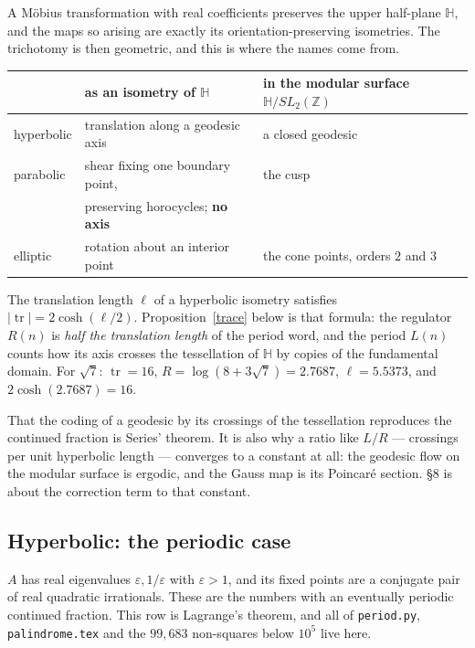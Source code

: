 \documentclass[12pt,a4paper]{article}
\theoremstyle{plain}
\theoremstyle{definition}
\newcommand{\tr}{\operatorname{tr}}
\begin{document}
A M\"obius transformation with real coefficients preserves the upper half-plane $\mathbb{H}$, and the maps so arising are exactly its orientation-preserving isometries. The trichotomy is then geometric, and this is where the names come from.

\begin{center}
\begin{tabular}{lll}
\toprule
 & as an isometry of $\mathbb{H}$ & in the modular surface $\mathbb{H}/SL_2(\mathbb{Z})$ \\
\midrule
hyperbolic & translation along a geodesic axis & a closed geodesic \\
parabolic  & shear fixing one boundary point, & the cusp \\
           & preserving horocycles; \textbf{no axis} & \\
elliptic   & rotation about an interior point & the cone points, orders $2$ and $3$ \\
\bottomrule
\end{tabular}
\end{center}

The translation length $\ell$ of a hyperbolic isometry satisfies $|\tr| = 2\cosh(\ell/2)$. Proposition~\ref{trace} below is that formula: the regulator $R(n)$ is \emph{half the translation length} of the period word, and the period $L(n)$ counts how its axis crosses the tessellation of $\mathbb{H}$ by copies of the fundamental domain. For $\sqrt7$: $\tr = 16$, $R = \log(8+3\sqrt7) = 2.7687$, $\ell = 5.5373$, and $2\cosh(2.7687) = 16$.

That the coding of a geodesic by its crossings of the tessellation reproduces the continued fraction is Series' theorem. It is also why a ratio like $L/R$ --- crossings per unit hyperbolic length --- converges to a constant at all: the geodesic flow on the modular surface is ergodic, and the Gauss map is its Poincar\'e section. \S8 is about the correction term to that constant.

\subsection*{Hyperbolic: the periodic case}

$A$ has real eigenvalues $\varepsilon, 1/\varepsilon$ with $\varepsilon > 1$, and its fixed points are a conjugate pair of real quadratic irrationals. These are the numbers with an eventually periodic continued fraction. This row is Lagrange's theorem, and all of \texttt{period.py}, \texttt{palindrome.tex} and the $99{,}683$ non-squares below $10^5$ live here.
\end{document}

